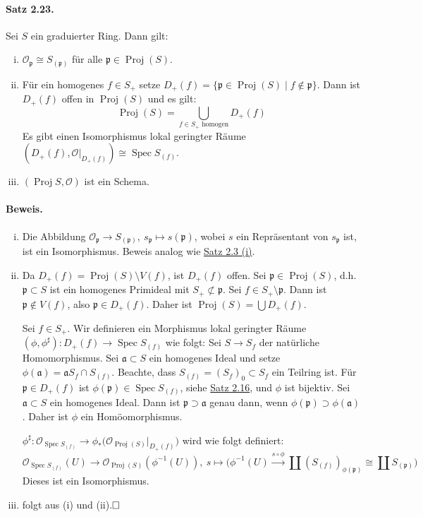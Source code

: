 \documentclass[11pt,b5paper,openany]{memoir}
\def \qed {$\hfill\square$}
\begin{document}
\paragraph{Satz 2.23.}\label{2.23} Sei $S$ ein graduierter Ring. Dann gilt:
\begin{enumerate}[(i)]
\item $\mathcal{O}_\mathfrak{p}\cong S_{(\mathfrak{p})}$ für alle $\mathfrak{p}\in\operatorname{Proj}(S)$.
\item Für ein homogenes $f\in S_+$ setze $D_+(f)=\{\mathfrak{p}\in\operatorname{Proj}(S)\mid f\not\in\mathfrak{p}\}$. Dann ist $D_+(f)$ offen in $\operatorname{Proj}(S)$ und es gilt:
\[\operatorname{Proj}(S) =\bigcup_{f\in S_+\text{ homogen}}D_+(f) \]
Es gibt einen Isomorphismus lokal geringter Räume $(D_+(f),\mathcal{O}|_{D_+(f)})\cong\operatorname{Spec}S_{(f)}$.
\item $(\operatorname{Proj}S,\mathcal{O})$ ist ein Schema.
\end{enumerate}

\paragraph{Beweis.}\begin{enumerate}[(i)]
\item Die Abbildung $\mathcal{O}_\mathfrak{p}\to S_{(\mathfrak{p})},\ s_\mathfrak{p}\mapsto s(\mathfrak{p})$, wobei $s$ ein Repräsentant von $s_\mathfrak{p}$ ist, ist ein Isomorphismus. Beweis analog wie \hyperref[2.3]{Satz 2.3 (i)}.
\item Da $D_+(f)=\operatorname{Proj}(S)\setminus V(f)$, ist $D_+(f)$ offen. Sei $\mathfrak{p}\in\operatorname{Proj}(S)$, d.h. $\mathfrak{p}\subset S$ ist ein homogenes Primideal mit $S_+\not\subset\mathfrak{p}$. Sei $f\in S_+\setminus\mathfrak{p}$. Dann ist $\mathfrak{p}\not\in V(f)$, also $\mathfrak{p}\in D_+(f)$. Daher ist $\operatorname{Proj}(S)=\bigcup D_+(f)$.

Sei $f\in S_+$. Wir definieren ein Morphismus lokal geringter Räume $(\phi,\phi^\sharp): D_+(f)\to\operatorname{Spec}S_{(f)}$ wie folgt: Sei $S\rightarrow S_f$ der natürliche Homomorphismus. Sei $\mathfrak{a}\subset S$ ein homogenes Ideal und setze $\phi(\mathfrak{a})=\mathfrak{a}S_f\cap S_{(f)}$. Beachte, dass $S_{(f)}=(S_f)_0\subset S_f$ ein Teilring ist. Für $\mathfrak{p}\in D_+(f)$ ist $\phi(\mathfrak{p})\in\operatorname{Spec}S_{(f)}$, siehe \hyperref[2.16]{Satz 2.16}, und $\phi$ ist bijektiv. Sei $\mathfrak{a}\subset S$ ein homogenes Ideal. Dann ist $\mathfrak{p}\supset\mathfrak{a}$ genau dann, wenn $\phi(\mathfrak{p})\supset\phi(\mathfrak{a})$. Daher ist $\phi$ ein Homöomorphismus.

$\phi^\sharp:\mathcal{O}_{\operatorname{Spec} S_{(f)}}\to\phi_\ast \big(\mathcal{O}_{\operatorname{Proj}(S)}|_{D_+(f)}\big)$ wird wie folgt definiert:
\[\mathcal{O}_{\operatorname{Spec}S_{(f)}}(U)\to\mathcal{O}_{\operatorname{Proj}(S)}(\phi^{-1}(U)),\ s\mapsto \Big(\phi^{-1}(U)\stackrel{s\circ\phi}{\longrightarrow}\coprod (S_{(f)})_{\phi(\mathfrak{p})} \cong\coprod S_{(\mathfrak{p})}\Big) \]
Dieses ist ein Isomorphismus.
\item folgt aus (i) und (ii).\qed
\end{enumerate}
\end{document}
